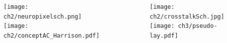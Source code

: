 \begin{frame}[t]
    \begin{columns}
        \begin{figure}[H]
            \centering
            \texttt{[image: ch2/neuropixelsch.png]} 
            \texttt{[image: ch2/conceptAC\_Harrison.pdf]} 
        \end{figure}

        \begin{figure}[H]
            \centering
            \texttt{[image: ch2/crosstalkSch.jpg]} 
            \texttt{[image: ch3/pseudo-lay.pdf]} 
        \end{figure}
    \end{columns}
\end{frame}

